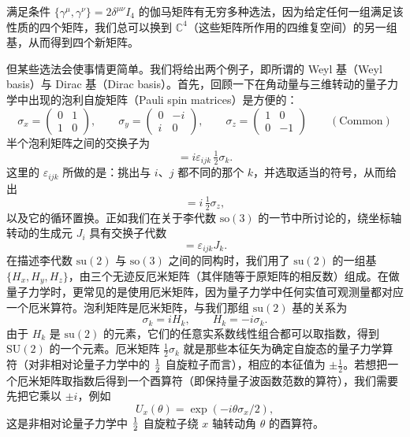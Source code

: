 满足条件 $\{\gamma^{\mu},\gamma^{\nu}\}=2\delta^{\mu\nu}I_{4}$ 的伽马矩阵有无穷多种选法，因为给定任何一组满足该性质的四个矩阵，我们总可以换到 $\mathbb{C}^{4}$（这些矩阵所作用的四维复空间）的另一组基，从而得到四个新矩阵。

但某些选法会使事情更简单。我们将给出两个例子，即所谓的 Weyl 基（Weyl basis）与 Dirac 基（Dirac basis）。首先，回顾一下在角动量与三维转动的量子力学中出现的泡利自旋矩阵（Pauli spin matrices）是方便的：
\begin{equation}
\sigma_{x}=
\begin{pmatrix}0&1\\1&0\end{pmatrix},\qquad
\sigma_{y}=
\begin{pmatrix}0&-i\\ i&0\end{pmatrix},\qquad
\sigma_{z}=
\begin{pmatrix}1&0\\0&-1\end{pmatrix}
\qquad(\text{Common})
\end{equation}
半个泡利矩阵之间的交换子为
\begin{equation}
[\tfrac12\sigma_{i},\tfrac12\sigma_{j}]=i\varepsilon_{ijk}\,\tfrac12\sigma_{k}.
\end{equation}
这里的 $\varepsilon_{ijk}$ 所做的是：挑出与 $i$、$j$ 都不同的那个 $k$，并选取适当的符号，从而给出
\begin{equation}
[\tfrac12\sigma_{x},\tfrac12\sigma_{y}]=i\,\tfrac12\sigma_{z},
\end{equation}
以及它的循环置换。正如我们在关于李代数 $\mathrm{so}(3)$ 的一节中所讨论的，绕坐标轴转动的生成元 $J_{i}$ 具有交换子代数
\begin{equation}
[J_{i},J_{j}]=\varepsilon_{ijk}J_{k}.
\end{equation}
在描述李代数 $\mathrm{su}(2)$ 与 $\mathrm{so}(3)$ 之间的同构时，我们用了 $\mathrm{su}(2)$ 的一组基 $\{H_{x},H_{y},H_{z}\}$，由三个无迹反厄米矩阵（其伴随等于原矩阵的相反数）组成。在做量子力学时，更常见的是使用厄米矩阵，因为量子力学中任何实值可观测量都对应一个厄米算符。泡利矩阵是厄米矩阵，与我们那组 $\mathrm{su}(2)$ 基的关系为
\begin{equation}
\sigma_{k}=iH_{k},\qquad H_{k}=-i\sigma_{k}.
\end{equation}
由于 $H_{k}$ 是 $\mathrm{su}(2)$ 的元素，它们的任意实系数线性组合都可以取指数，得到 $\mathrm{SU}(2)$ 的一个元素。厄米矩阵 $\tfrac12\sigma_{k}$ 就是那些本征矢为确定自旋态的量子力学算符（对非相对论量子力学中的 $\tfrac{1}{2}$ 自旋粒子而言），相应的本征值为 $\pm\tfrac12$。若想把一个厄米矩阵取指数后得到一个酉算符（即保持量子波函数范数的算符），我们需要先把它乘以 $\pm i$，例如
\begin{equation}
U_{x}(\theta)=\exp(-i\theta\sigma_{x}/2),
\end{equation}
这是非相对论量子力学中 $\tfrac{1}{2}$ 自旋粒子绕 $x$ 轴转动角 $\theta$ 的酉算符。

